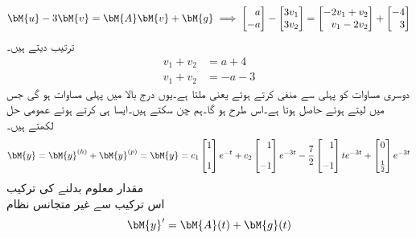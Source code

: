 \begin{gather*}
\begin{aligned}
\bM{u}-3\bM{v}=\bM{A}\bM{v}+\bM{g}
\end{aligned}\implies
\begin{aligned}
\begin{bmatrix*}[r] a\\-a  \end{bmatrix*}-\begin{bmatrix} 3v_1\\3v_2 \end{bmatrix}=\begin{bmatrix*}[r] -2v_1+v_2\\v_1-2v_2 \end{bmatrix*}+\begin{bmatrix*}[r] -4\\3 \end{bmatrix*}
\end{aligned} 
\end{gather*}
ترتیب دیتے ہیں۔
\begin{align*}
v_1+v_2&=a+4\\
v_1+v_2&=-a-3
\end{align*}
دوسری مساوات کو پہلی سے منفی کرتے ہوئے  یعنی  ملتا ہے۔یوں درج بالا میں پہلی مساوات  ہو گی جس  میں   لیتے ہوئے   حاصل ہوتا ہے۔اس طرح  ہو گا۔ہم  چن سکتے ہیں۔ایسا ہی کرتے ہوئے عمومی حل لکھتے ہیں۔
\begin{align}
\bM{y}=\bM{y}^{(h)}+\bM{y}^{(p)}=\bM{y}=c_1\begin{bmatrix} 1 \\[1em] 1 \end{bmatrix}e^{-t}+c_2\begin{bmatrix*}[r] 1\\[1em] -1 \end{bmatrix*}e^{-3t}-\frac{7}{2}\begin{bmatrix*}[r] 1\\[1em] -1 \end{bmatrix*}te^{-3t}+\begin{bmatrix} 0\\[1em]\frac{1}{2} \end{bmatrix}e^{-3t}
\end{align}
\quad مقدار معلوم بدلنے کی ترکیب\\
اس ترکیب سے غیر متجانس نظام
\begin{align}\label{مساوات_نظام_غیر_متجانس_مقدار_معلوم_الف}
\bM{y}'=\bM{A}(t)+\bM{g}(t)
\end{align}
